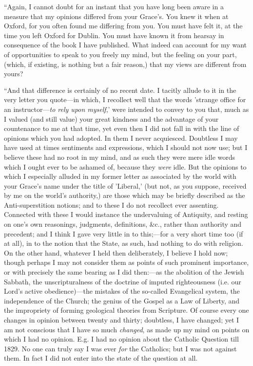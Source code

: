 ``Again, I cannot doubt for an instant that you have
long been aware in a measure that my opinions differed from your Grace's.
You knew it when at Oxford, for you often found me differing from you.
You must have felt it, at the time you left Oxford for Dublin. You must
have known it from hearsay in consequence of the book I have published.
What indeed can account for my want of opportunities to speak to you
freely my mind, but the feeling on your part, (which, if existing, is
nothing but a fair reason,) that my views are different from yours?

``And that difference is certainly of no recent
date. I tacitly allude to it in the very letter you quote—in which, I
recollect well that the words 'strange office for an instructor—\emph{to
rely upon myself},' were intended to convey to you that, much as I
valued (and still value) your great kindness and the advantage of your
countenance to me at that time, yet even then I did not fall in with the
line of opinions which you had adopted. In them I never acquiesced.
Doubtless I may have used at times sentiments and expressions, which I
should not now use; but I believe these had no root in my mind, and as
such they were mere idle words which I ought ever to be ashamed of,
because they \emph{were} idle. But the opinions to which I especially
alluded in my former letter as associated by the world with your Grace's
name under the title of 'Liberal,' (but not, as you suppose, received by
me on the world's authority,) are those which may be briefly described
as the Anti-superstition notions; and to these I do not recollect ever
assenting. Connected with these I would instance the undervaluing
of Antiquity, and resting on one's own reasonings, judgments,
definitions, \&c., rather than authority and precedent; and I think I
gave very little in to this;—for a very short time too (if at all), in
to the notion that the State, as such, had nothing to do with religion.
On the other hand, whatever I held then deliberately, I believe I hold
now; though perhaps I may not consider them as points of such prominent
importance, or with precisely the same bearing as I did then:—as the
abolition of the Jewish Sabbath, the unscripturalness of the doctrine of
imputed righteousness (i.e. our Lord's active obedience)—the mistakes
of the so-called Evangelical system, the independence of the Church; the
genius of the Gospel as a Law of Liberty, and the impropriety of forming
geological theories from Scripture. Of course every one changes in
opinion between twenty and thirty; doubtless, I have changed; yet I am
not conscious that I have so much \emph{changed}, as made up my mind on points
on which I had no opinion. E.g. I had no opinion about the Catholic
Question till 1829. No one can truly say I was ever \emph{for} the Catholics;
but I was not against them. In fact I did not enter into the state of
the question at all.

